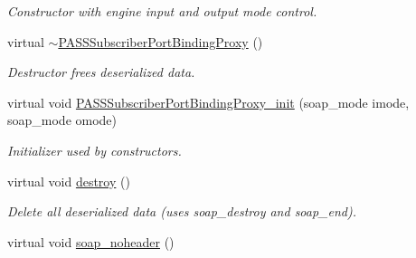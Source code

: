 \begin{DoxyCompactItemize}
\begin{DoxyCompactList}\small\item\em Constructor with engine input and output mode control. \item\end{DoxyCompactList}\item 
\hypertarget{classPASSSubscriberPortBindingProxy_a1e5eadcd1ef52b25c474d46ed38e9ddf}{
virtual \hyperlink{classPASSSubscriberPortBindingProxy_a1e5eadcd1ef52b25c474d46ed38e9ddf}{$\sim$PASSSubscriberPortBindingProxy} ()}
\label{classPASSSubscriberPortBindingProxy_a1e5eadcd1ef52b25c474d46ed38e9ddf}

\begin{DoxyCompactList}\small\item\em Destructor frees deserialized data. \item\end{DoxyCompactList}\item 
\hypertarget{classPASSSubscriberPortBindingProxy_abbcce50673c24f254561e18ab9469325}{
virtual void \hyperlink{classPASSSubscriberPortBindingProxy_abbcce50673c24f254561e18ab9469325}{PASSSubscriberPortBindingProxy\_\-init} (soap\_\-mode imode, soap\_\-mode omode)}
\label{classPASSSubscriberPortBindingProxy_abbcce50673c24f254561e18ab9469325}

\begin{DoxyCompactList}\small\item\em Initializer used by constructors. \item\end{DoxyCompactList}\item 
\hypertarget{classPASSSubscriberPortBindingProxy_a402d26b55f1b7a5962390cfb9a0d3500}{
virtual void \hyperlink{classPASSSubscriberPortBindingProxy_a402d26b55f1b7a5962390cfb9a0d3500}{destroy} ()}
\label{classPASSSubscriberPortBindingProxy_a402d26b55f1b7a5962390cfb9a0d3500}

\begin{DoxyCompactList}\small\item\em Delete all deserialized data (uses soap\_\-destroy and soap\_\-end). \item\end{DoxyCompactList}\item 
\hypertarget{classPASSSubscriberPortBindingProxy_aef97777bde3b515ae3ecd75f586b26dc}{
virtual void \hyperlink{classPASSSubscriberPortBindingProxy_aef97777bde3b515ae3ecd75f586b26dc}{soap\_\-noheader} ()}
\label{classPASSSubscriberPortBindingProxy_aef97777bde3b515ae3ecd75f586b26dc}


\end{DoxyCompactItemize}
